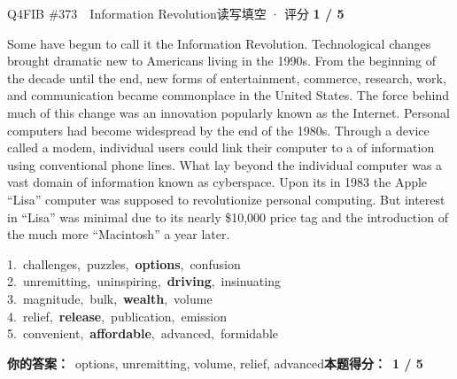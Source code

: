 \begin{qblock}{Q4\quad FIB \#373\ \ Information Revolution}{读写填空 · 评分 \textcolor{cAccent}{\bfseries 1 / 5}}
\begin{promptbox}
Some have begun to call it the Information Revolution. Technological changes brought dramatic new  to Americans living in the 1990s. From the beginning of the decade until the end, new forms of entertainment, commerce, research, work, and communication became commonplace in the United States. The  force behind much of this change was an innovation popularly known as the Internet. Personal computers had become widespread by the end of the 1980s. Through a device called a modem, individual users could link their computer to a  of information using conventional phone lines. What lay beyond the individual computer was a vast domain of information known as cyberspace. Upon its  in 1983 the Apple ``Lisa'' computer was supposed to revolutionize personal computing. But interest in ``Lisa'' was minimal due to its nearly \$10,000 price tag and the introduction of the much more  ``Macintosh'' a year later.
\end{promptbox}
{\small
1.\ challenges,\ puzzles,\ \textbf{options},\ confusion\\
2.\ unremitting,\ uninspiring,\ \textbf{driving},\ insinuating\\
3.\ magnitude,\ bulk,\ \textbf{wealth},\ volume\\
4.\ relief,\ \textbf{release},\ publication,\ emission\\
5.\ convenient,\ \textbf{affordable},\ advanced,\ formidable}
\par\smallskip
\textbf{你的答案：}\ options, {\color{cWrong}unremitting, volume, relief, advanced}\qquad\textbf{本题得分：}\ {\color{cAccent}\bfseries 1 / 5}
\end{qblock}

